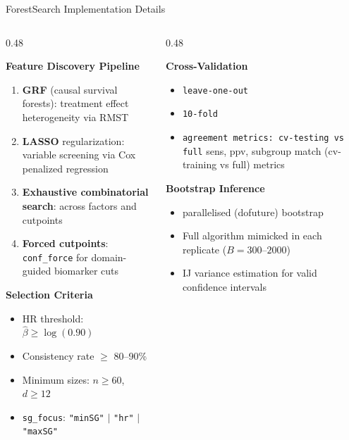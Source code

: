 \documentclass[
  ignorenonframetext,
  aspectratio=169]{beamer}
\begin{document}
\begin{frame}[shrink]{ForestSearch Implementation Details}
\label{forestsearch-implementation-details}
\begin{columns}[T]
\begin{column}{0.48\textwidth}

\textbf{Feature Discovery Pipeline}

\begin{enumerate}
\item \textbf{GRF} (causal survival forests): treatment effect heterogeneity via RMST
\item \textbf{LASSO} regularization: variable screening via Cox penalized regression
\item \textbf{Exhaustive combinatorial search}: across factors and cutpoints
\item \textbf{Forced cutpoints}: \texttt{conf\_force} for domain-guided biomarker cuts
\end{enumerate}

\medskip

\textbf{Selection Criteria}

\begin{itemize}
\item HR threshold: $\hat{\beta} \geq \log(0.90)$ 
\item Consistency rate $\geq$ 80--90\% 
\item Minimum sizes: $n \geq 60$, $d \geq 12$ 
\item \texttt{sg\_focus}: \texttt{"minSG"} $|$ \texttt{"hr"} $|$ \texttt{"maxSG"}
\end{itemize}

\end{column}
\begin{column}{0.48\textwidth}

\textbf{Cross-Validation}
\begin{itemize}
\item \texttt{leave-one-out}
\item \texttt{10-fold}
\item \texttt{agreement metrics: cv-testing vs full} sens, ppv, subgroup match (cv-training vs full) metrics
\end{itemize}

\medskip
\textbf{Bootstrap Inference}
\begin{itemize}
\item parallelised (dofuture) bootstrap
\item Full algorithm mimicked in each replicate ($B = 300$--$2000$)
\item IJ variance estimation for valid confidence intervals
\end{itemize}

\end{column}
\end{columns}
\end{frame}
\end{document}
